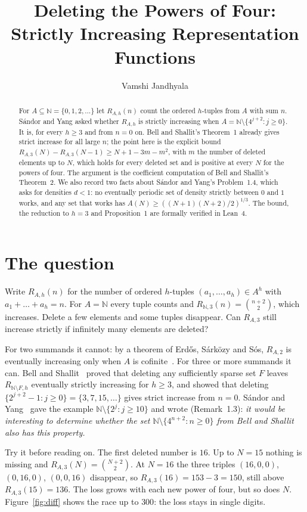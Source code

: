 \documentclass[11pt]{amsart}
\title{Deleting the Powers of Four: Strictly Increasing Representation Functions}
\author{Vamshi Jandhyala}
\theoremstyle{remark}
\newcommand{\N}{\mathbb{N}}
\begin{document}
\begin{abstract}
For $A\subseteq\N=\{0,1,2,\dots\}$ let $R_{A,h}(n)$ count the ordered $h$-tuples from $A$ with sum $n$. Sándor and Yang asked whether $R_{A,h}$ is strictly increasing when $A=\N\setminus\{4^{j+2}:j\ge0\}$. It is, for every $h\ge3$ and from $n=0$ on. Bell and Shallit's Theorem~1 already gives strict increase for all large $n$; the point here is the explicit bound $R_{A,3}(N)-R_{A,3}(N-1)\ge N+1-3m-m^2$, with $m$ the number of deleted elements up to $N$, which holds for every deleted set and is positive at every $N$ for the powers of four. The argument is the coefficient computation of Bell and Shallit's Theorem~2. We also record two facts about Sándor and Yang's Problem~1.4, which asks for densities $d<1$: no eventually periodic set of density strictly between $0$ and $1$ works, and any set that works has $A(N)\ge((N+1)(N+2)/2)^{1/3}$. The bound, the reduction to $h=3$ and Proposition~1 are formally verified in Lean~4.
\end{abstract}

\maketitle

\section{The question}

Write $R_{A,h}(n)$ for the number of ordered $h$-tuples $(a_1,\dots,a_h)\in A^h$ with $a_1+\dots+a_h=n$. For $A=\N$ every tuple counts and $R_{\N,3}(n)=\binom{n+2}{2}$, which increases. Delete a few elements and some tuples disappear. Can $R_{A,3}$ still increase strictly if infinitely many elements are deleted?

For two summands it cannot: by a theorem of Erdős, Sárközy and Sós, $R_{A,2}$ is eventually increasing only when $A$ is cofinite~\cite{SY}. For three or more summands it can. Bell and Shallit~\cite{BS} proved that deleting any sufficiently sparse set $F$ leaves $R_{\N\setminus F,h}$ eventually strictly increasing for $h\ge3$, and showed that deleting $\{2^{j+2}-1:j\ge0\}=\{3,7,15,\dots\}$ gives strict increase from $n=0$. Sándor and Yang~\cite{SY} gave the example $\N\setminus\{2^j:j\ge10\}$ and wrote (Remark~1.3): \emph{it would be interesting to determine whether the set $\N\setminus\{4^{n+2}:n\ge0\}$ from Bell and Shallit also has this property.}

Try it before reading on. The first deleted number is $16$. Up to $N=15$ nothing is missing and $R_{A,3}(N)=\binom{N+2}{2}$. At $N=16$ the three triples $(16,0,0)$, $(0,16,0)$, $(0,0,16)$ disappear, so $R_{A,3}(16)=153-3=150$, still above $R_{A,3}(15)=136$. The loss grows with each new power of four, but so does $N$. Figure~\ref{fig:diff} shows the race up to $300$: the loss stays in single digits.
\end{document}
